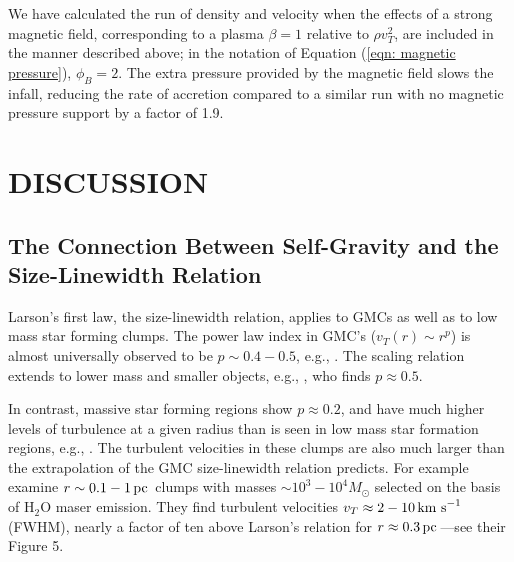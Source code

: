 \documentclass[iop,apj,numberedappendix]{emulateapj}
\newcommand       \pc		{\,{\rm pc \,}}
\newcommand       \kms          {\,{\rm km \,\, s}^{-1}}
\begin{document}



We have calculated the run of density and velocity when
the effects of a strong magnetic field, corresponding to a plasma
$\beta=1$ relative to $\rho v_T^2$, are
included in the manner described above; in the notation of
Equation (\ref{eqn: magnetic pressure}), $\phi_B=2$. The extra pressure provided by
the magnetic field slows the infall, reducing the rate of accretion
compared to a similar run with no magnetic pressure support by a
factor of 1.9.


\section{DISCUSSION}
\label{sec:discussion}


\subsection{The Connection Between Self-Gravity and the
Size-Linewidth Relation}

Larson's first law, the size-linewidth relation, applies to GMCs as
well as to low mass star forming clumps. The power law index in GMC's
($v_T(r)\sim r^p$) is almost
universally observed to be $p\sim 0.4-0.5$, e.g.,
\citet{1981MNRAS.194..809L,1987ApJ...319..730S,2004ApJ...615L..45H}.
 The scaling relation extends to lower mass and smaller objects, e.g.,
\citet{1983ApJ...270..105M}, who finds $p\approx0.5$.  

In contrast, massive star forming regions show $p\approx 0.2$, and
have much higher levels of turbulence at a given radius than is seen
in low mass star formation regions, e.g., \citet{1992ApJ...384..523F,
  1995ApJ...446..665C,1997ApJ...476..730P}. The turbulent velocities
in these clumps are also much larger than the extrapolation of the GMC
size-linewidth relation predicts. For example
\citet{1997ApJ...476..730P} examine $r\sim0.1-1\pc$ clumps with masses
$\sim 10^3-10^4M_\odot$ selected on the basis of H$_2$O maser
emission. They find turbulent velocities $v_T\approx 2-10\kms$ (FWHM),
nearly a factor of ten above Larson's relation for $r\approx
0.3\pc$---see their Figure 5.
\end{document}
